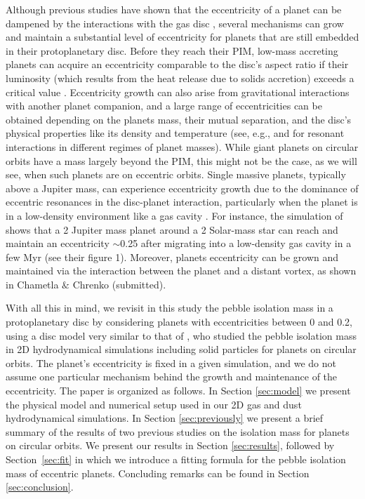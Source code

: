 \documentclass[fleqn,usenatbib]{mnras}
\begin{document}
Although previous studies have shown that the eccentricity of a planet can be dampened by the interactions with the gas disc \citep[][]{2008A&A...482..677C,2010A&A...523A..30B}, several mechanisms can grow and maintain a substantial level of eccentricity for planets that are still embedded in their protoplanetary disc. Before they reach their PIM, low-mass accreting planets can acquire an eccentricity comparable to the disc's aspect ratio if their luminosity (which results from the heat release due to solids accretion) exceeds a critical value \citep[][]{2017MNRAS.469..206E,Chrenko2017,2019MNRAS.485.5035F,2021MNRAS.tmp.3059R}. Eccentricity growth can also arise from gravitational interactions with another planet companion, and a large range of eccentricities can be obtained depending on the planets mass, their mutual separation, and the disc's physical properties like its density and temperature (see, e.g., \citealp{Kley04} and \citealp{Pierens08} for resonant interactions in different regimes of planet masses). While giant planets on circular orbits have a mass largely beyond the PIM, this might not be the case, as we will see, when such planets are on eccentric orbits. Single massive planets, typically above a Jupiter mass, can experience eccentricity growth due to the dominance of eccentric resonances in the disc-planet interaction, particularly when the planet is in a low-density environment like a gas cavity \citep[e.g.,][]{2001A&A...366..263P,2006A&A...447..369K,2006ApJ...652.1698D,2013A&A...555A.124B,Debras21}. For instance, the simulation of \citet{Baruteau2021} shows that a 2 Jupiter mass planet around a 2 Solar-mass star can reach and maintain an eccentricity $\sim$0.25 after migrating into a low-density gas cavity in a few Myr (see their figure 1). Moreover, planets eccentricity can be grown and maintained via the interaction between the planet and a distant vortex, as shown in Chametla $\&$ Chrenko (submitted).

With all this in mind, we revisit in this study the pebble isolation mass in a protoplanetary disc by considering planets with eccentricities between 0 and 0.2, using a disc model very similar to that of \citet{Ataiee_etal2018}, who studied the pebble isolation mass in 2D hydrodynamical simulations including solid particles for planets on circular orbits. The planet's eccentricity is fixed in a given simulation, and we do not assume one particular mechanism behind the growth and maintenance of the eccentricity. The paper is organized as follows. In Section \ref{sec:model} we present the physical model and numerical setup used in our 2D gas and dust hydrodynamical simulations. In Section \ref{sec:previously} we present a brief summary of the results of two previous studies on the isolation mass for planets on circular orbits. We present our results in Section \ref{sec:results}, followed by Section~\ref{sec:fit} in which we introduce a fitting formula for the pebble isolation mass of eccentric planets. Concluding remarks can be found in Section \ref{sec:conclusion}.
\end{document}
